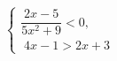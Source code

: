 \begin{ex}[type=ineq_system]
	\begin{condition}
		$\begin{cases} \dfrac{2x - 5}{5x^2 + 9}<0 ,\\
			\;  4x - 1>2x + 3 
		\end{cases}$
	\end{condition}
\end{ex}